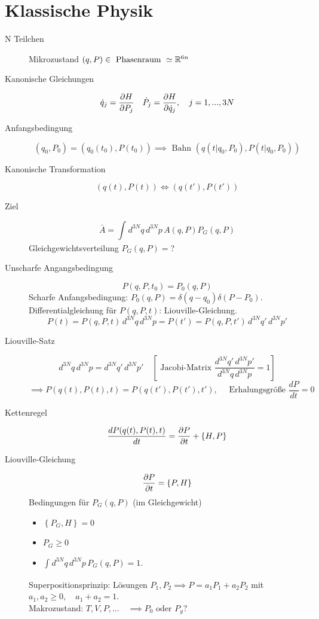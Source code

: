 \section{Klassische Physik}
\begin{description}
  \item[N Teilchen ] Mikrozustand $(q,P) \in  \text{ Phasenraum } \simeq \mathbb{R}^{6n}$
  \item[Kanonische Gleichungen] \[ \dot{q}_j = \frac{\partial H }{\partial P_j} \quad \dot{P}_j = \frac{\partial H }{\partial \dot{q}_j}, \quad j=1,...,3N \] 
  \item[Anfangsbedingung] \[ (q_0, P_0)= (q_0(t_0), P(t_0)) \implies \text{ Bahn }
    (q(t | q_0, P_0), P(t| q_0, P_0)) \] 
  \item[Kanonische Transformation ] \[ (q(t), P(t)) \iff (q(t'), P(t')) \] 
  \item[Ziel] \[ \bar{A}= \int_{}^{} d^{3N}q\, d^{3N}p\, A(q,P) P_G(q,P) \] 
    Gleichgewichtsverteilung $P_G(q,P)= $?
  \item[Unscharfe Angangsbedingung] \[ P(q,P,t_0)= P_0 (q,P) \] 
    Scharfe Anfangsbedingung: $P_0(q,P) = \delta(q-q_0) \delta (P-P_0)$.
    Differentialgleichung f\"ur $P(q,P,t)$: Liouville-Gleichung.
    \[ P(t)= P(q,P,t)\, d^{3N}q\, d^{3N}p=P(t') = P(q,P,t')\, d^{3N}q'\, d^{3N}p' \] 
  \item[Liouville-Satz] \[ d^{3N}q\, d^{3N}p = d^{3N}q'\, d^{3N}p' \quad \left[
    \text{ Jacobi-Matrix } \frac{d^{3N}q'\, d^{3N}p'}{d^{3N}q\, d^{3N}p}= 1 \right] \] 
    \[ \implies P(q(t), P(t), t)= P(q(t'), P(t'), t'), \quad
    \text{ Erhalungsgr\"o\ss{}e } \frac{dP}{dt}=0 \] 
  \item[Kettenregel] \[ \frac{d P(q(t), P(t),t)}{dt}= \frac{\partial P }{\partial t} + \left\{ H,P \right\} \] 
  \item[Liouville-Gleichung] \[ \frac{\partial P }{\partial t}= \left\{ P,H \right\} \] 
    Bedingungen f\"ur $P_G(q,P)$ (im Gleichgewicht)
    \begin{itemize}
      \item $\left\{ P_G, H \right\}=0$
      \item $P_G \ge 0$
      \item $\int_{}^{}d^{3N}q\, d^{3N}p\, P_G (q,P)=1$.
    \end{itemize}
    Superpositionsprinzip: L\"osungen $P_1,P_2 \implies P=a_1 P_1+ a_2 P_2 $
    mit $a_1,a_2 \ge 0, \quad a_1+a_2 =1$. \\
    Makrozustand: $T,V,P,... \quad  \implies P_0 \text{ oder } P_g$?\\
\end{description}
